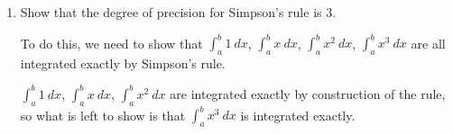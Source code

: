 \documentclass[12pt,letterpaper,noanswers]{exam}
\begin{document}
\begin{enumerate}[resume=classQ]
    \item Show that the degree of precision for Simpson's rule is $3$.
    
    To do this, we need to show that $\int_a^b 1\ dx$, $\int_a^b x\ dx$, $\int_a^b x^2\ dx$, $\int_a^b x^3\ dx$ are all integrated exactly by Simpson's rule.

$\int_a^b 1\ dx$, $\int_a^b x\ dx$, $\int_a^b x^2\ dx$ are integrated exactly by construction of the rule, so what is left to show is that $\int_a^b x^3\ dx$ is integrated exactly.
    
\end{enumerate}
\end{document}
